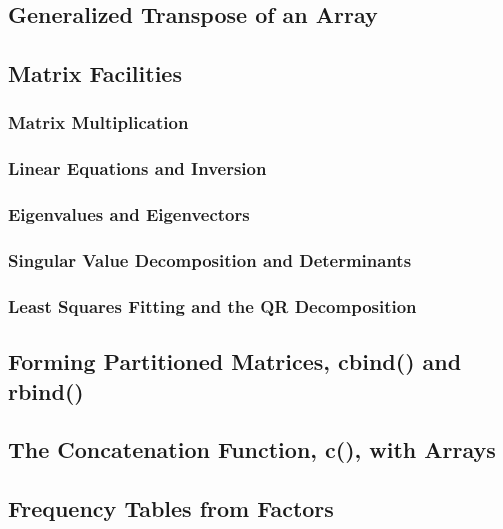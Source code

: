 \documentclass{article}
\begin{document}
\subsection{Generalized Transpose of an Array}
\subsection{Matrix Facilities}
\subsubsection{Matrix Multiplication}
\subsubsection{Linear Equations and Inversion}
\subsubsection{Eigenvalues and Eigenvectors}
\subsubsection{Singular Value Decomposition and Determinants}
\subsubsection{Least Squares Fitting and the QR Decomposition}
\subsection{Forming Partitioned Matrices, cbind() and rbind()}
\subsection{The Concatenation Function, c(), with Arrays}
\subsection{Frequency Tables from Factors}
\end{document}
